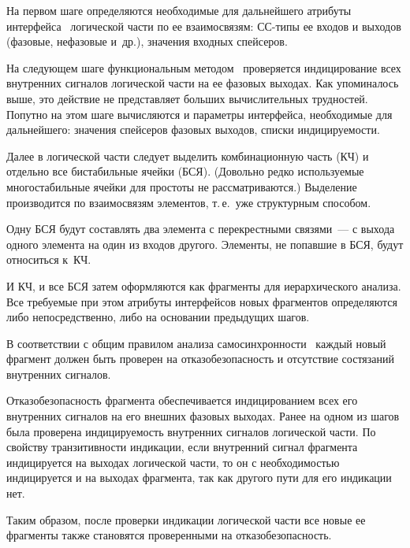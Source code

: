 \begin{multicols}{2}
{}

  На первом шаге определяются необходимые для дальнейшего атрибуты
интерфейса~\cite{5-p, 16-p} логической части по ее взаимосвязям: СС-ти\-пы ее
входов и выходов (фазовые, нефазовые и~др.), значения входных спейсеров.

  На следующем шаге функциональным методом~\cite{3-p} проверяется
индицирование всех внут\-рен\-них сигналов логической части на ее фазовых
\mbox{выходах}. Как упоминалось выше, это действие не представляет больших
вычислительных трудностей. Попутно на этом шаге вычисляются и параметры
интерфейса, необходимые для дальнейшего: значения спейсеров фазовых
выходов, списки индицируемости.

  Далее в логической части следует выделить комбинационную часть (КЧ) и
отдельно все бистабильные ячейки (БСЯ). (Довольно редко используемые
многостабильные ячейки для простоты не рас\-смат\-ри\-ва\-ют\-ся.) Выделение
производится по взаимосвязям элементов, т.\,е.\ уже структурным способом.

  Одну БСЯ будут составлять два элемента с перекрестными связями~--- с
выхода одного элемента на один из входов другого. Элементы, не попавшие в
БСЯ, будут относиться к~КЧ.

  И КЧ, и все БСЯ затем оформляются как фрагменты для иерархического
анализа. Все требуемые при этом атрибуты интерфейсов новых фрагментов
определяются либо непосредственно, либо на основании предыдущих шагов.

  В соответствии с общим правилом анализа самосинхронности~\cite{5-p, 16-p}
каждый новый фрагмент должен быть проверен на отказобезопасность и
отсутствие состязаний внутренних сигналов.

  Отказобезопасность фрагмента обеспечивается индицированием всех его
внутренних сигналов на его внешних фазовых выходах. Ранее на одном из
шагов была проверена индицируемость внутренних сигналов логической части.
По свойству транзитивности индикации, если внутренний сигнал фрагмента
индицируется на выходах логической части, то он с необходимостью
индицируется и на выходах фрагмента, так как другого пути для его индикации
нет.

  Таким образом, после проверки индикации логической части все новые ее
фрагменты также становятся проверенными на отказобезопасность.

  \begin{figure*} %
  \vspace*{1pt}
\begin{center}
\mbox{%
\epsfxsize=125.496mm
}
\end{center}
\vspace*{-9pt}
   \end{figure*}


\end{multicols}
